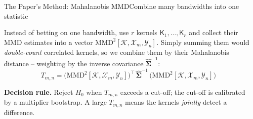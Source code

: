 \documentclass[aspectratio=169,10pt]{beamer}
\newcommand{\sfK}{\mathsf{K}}                      %
\newcommand{\Sig}{\hat{\boldsymbol{\Sigma}}}        %
\newcommand{\mmdvec}{\mathrm{MMD}^2[\mathcal K,\mathcal X_m,\mathcal Y_n]} %
\begin{document}
\begin{frame}{The Paper's Method: Mahalanobis MMD}{Combine many bandwidths into one statistic}

\vspace{0.04cm}
Instead of betting on one bandwidth, use $r$ kernels $\sfK_1,\dots,\sfK_r$ and collect their
MMD estimates into a vector $\mmdvec$. Simply summing them would \emph{double-count}
correlated kernels, so we combine them by their Mahalanobis distance -- weighting by the
inverse covariance $\Sig^{-1}$:
\[
  \boxed{\;T_{m,n}=\big(\mmdvec\big)^{\!\top}\,\Sig^{-1}\,\big(\mmdvec\big)\;}
\]

\vspace{0.20cm}
\textbf{Decision rule.} Reject $H_0$ when $T_{m,n}$ exceeds a cut-off; the cut-off is
calibrated by a multiplier bootstrap. A large
$T_{m,n}$ means the kernels \emph{jointly} detect a difference.

\end{frame}


\end{document}
